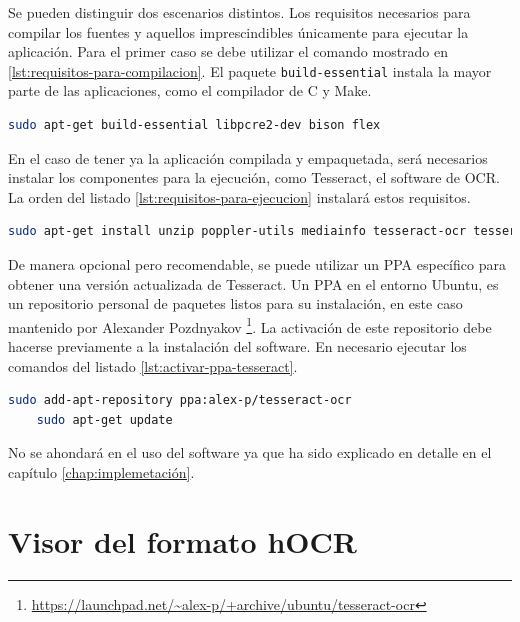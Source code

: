 Se pueden distinguir dos escenarios distintos. Los requisitos necesarios para compilar los fuentes y aquellos imprescindibles únicamente para ejecutar la aplicación. Para el primer caso se debe utilizar el comando mostrado en \ref{lst:requisitos-para-compilacion}. El paquete \verb|build-essential| instala la mayor parte de las aplicaciones, como el compilador de C y Make.

\begin{lstlisting}[language=bash,caption={Dependencias para la compilación},label=lst:requisitos-para-compilacion]
    sudo apt-get build-essential libpcre2-dev bison flex
\end{lstlisting}

En el caso de tener ya la aplicación compilada y empaquetada, será necesarios instalar los componentes para la ejecución, como Tesseract, el software de OCR. La orden del listado \ref{lst:requisitos-para-ejecucion} instalará estos requisitos.

\begin{lstlisting}[language=bash,caption={Dependencias para la ejecución},label=lst:requisitos-para-ejecucion]
    sudo apt-get install unzip poppler-utils mediainfo tesseract-ocr tesseract-ocr-spa jq python3-opencv jq bc
\end{lstlisting}

De manera opcional pero recomendable, se puede utilizar un PPA específico para obtener una versión actualizada de Tesseract. Un PPA en el entorno Ubuntu, es un repositorio personal de paquetes listos para su instalación, en este caso mantenido por Alexander Pozdnyakov \footnote{\url{https://launchpad.net/~alex-p/+archive/ubuntu/tesseract-ocr}}. La activación de este repositorio debe hacerse previamente a la instalación del software. En necesario ejecutar los comandos del listado \ref{lst:activar-ppa-tesseract}.

\begin{lstlisting}[language=bash,caption={Activar PPA de Tesseract},label=lst:activar-ppa-tesseract]
    sudo add-apt-repository ppa:alex-p/tesseract-ocr
    sudo apt-get update
\end{lstlisting}

No se ahondará en el uso del software ya que ha sido explicado en detalle en el capítulo \ref{chap:implemetación}.

\section{Visor del formato hOCR}

